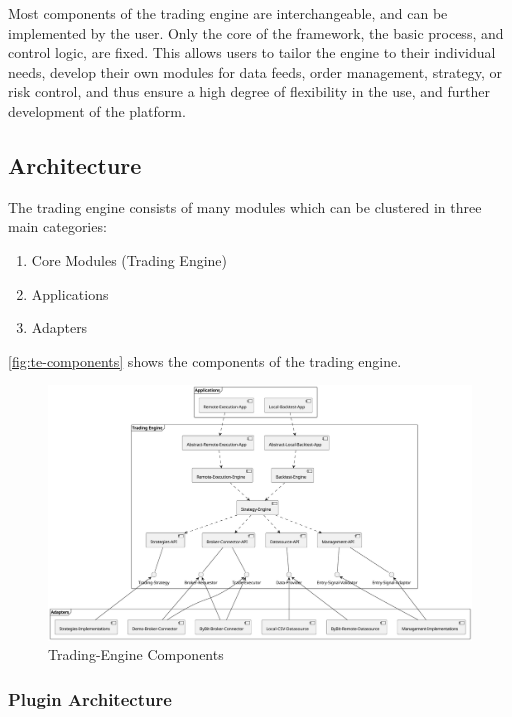 Most components of the trading engine are interchangeable, and can be implemented by the user. Only the core of the framework, the basic process, and control logic, are fixed. This allows users to tailor the engine to their individual needs, develop their own modules for data feeds, order management, strategy, or risk control, and thus ensure a high degree of flexibility in the use, and further development of the platform.

\subsection{Architecture}

The trading engine consists of many modules which can be clustered in three main categories:

\begin{enumerate}
    \item Core Modules (Trading Engine)
    \item Applications
    \item Adapters
\end{enumerate}

\autoref{fig:te-components} shows the components of the trading engine.

\begin{figure}[H]
    \centering
    \includegraphics[width=\textwidth]{images/trading-engine/trading-engine-components.pdf}
    \caption{Trading-Engine Components}
    \label{fig:te-components}
\end{figure}

\subsubsection{Plugin Architecture}

